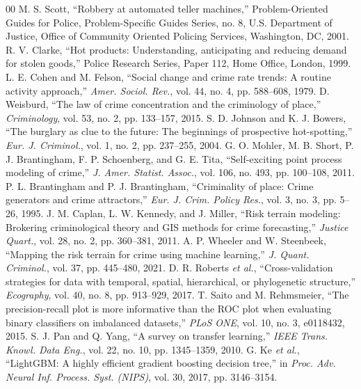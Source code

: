 \documentclass[conference]{IEEEtran}
\begin{document}
\begin{thebibliography}{00}
 M. S. Scott, ``Robbery at automated teller machines,'' Problem-Oriented Guides for Police,
Problem-Specific Guides Series, no. 8, U.S. Department of Justice, Office of Community Oriented Policing Services,
Washington, DC, 2001.
 R. V. Clarke, ``Hot products: Understanding, anticipating and reducing demand for stolen goods,''
Police Research Series, Paper 112, Home Office, London, 1999.
 L. E. Cohen and M. Felson, ``Social change and crime rate trends: A routine activity approach,''
\textit{Amer. Sociol. Rev.}, vol. 44, no. 4, pp. 588--608, 1979.
 D. Weisburd, ``The law of crime concentration and the criminology of place,''
\textit{Criminology}, vol. 53, no. 2, pp. 133--157, 2015.
 S. D. Johnson and K. J. Bowers, ``The burglary as clue to the future: The beginnings of
prospective hot-spotting,'' \textit{Eur. J. Criminol.}, vol. 1, no. 2, pp. 237--255, 2004.
 G. O. Mohler, M. B. Short, P. J. Brantingham, F. P. Schoenberg, and G. E. Tita,
``Self-exciting point process modeling of crime,'' \textit{J. Amer. Statist. Assoc.}, vol. 106, no. 493,
pp. 100--108, 2011.
 P. L. Brantingham and P. J. Brantingham, ``Criminality of place: Crime generators and
crime attractors,'' \textit{Eur. J. Crim. Policy Res.}, vol. 3, no. 3, pp. 5--26, 1995.
 J. M. Caplan, L. W. Kennedy, and J. Miller, ``Risk terrain modeling: Brokering criminological
theory and GIS methods for crime forecasting,'' \textit{Justice Quart.}, vol. 28, no. 2, pp. 360--381, 2011.
 A. P. Wheeler and W. Steenbeek, ``Mapping the risk terrain for crime using machine learning,''
\textit{J. Quant. Criminol.}, vol. 37, pp. 445--480, 2021.
 D. R. Roberts \textit{et al.}, ``Cross-validation strategies for data with temporal, spatial,
hierarchical, or phylogenetic structure,'' \textit{Ecography}, vol. 40, no. 8, pp. 913--929, 2017.
 T. Saito and M. Rehmsmeier, ``The precision-recall plot is more informative than the ROC plot
when evaluating binary classifiers on imbalanced datasets,'' \textit{PLoS ONE}, vol. 10, no. 3, e0118432, 2015.
 S. J. Pan and Q. Yang, ``A survey on transfer learning,'' \textit{IEEE Trans. Knowl. Data Eng.},
vol. 22, no. 10, pp. 1345--1359, 2010.
 G. Ke \textit{et al.}, ``LightGBM: A highly efficient gradient boosting decision tree,'' in
\textit{Proc. Adv. Neural Inf. Process. Syst. (NIPS)}, vol. 30, 2017, pp. 3146--3154.

\end{thebibliography}
\end{document}
